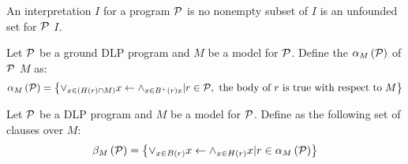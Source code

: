 \begin{defi}
An interpretation $I$ for a program $\mathcal{P}$ is  \iffTx{} no nonempty subset of $I$ is an unfounded set for $\mathcal{P}$ \wrtTx{} $I$.
\cite{conf/ijcai/KochL99}
\end{defi}

\begin{defi}
Let $\mathcal{P}$ be a ground DLP program and $M$ be a model for $\mathcal{P}$. Define the  $\alpha_M\left(\mathcal{P}\right)$ of $\mathcal{P}$ \wrtTx{} $M$ as:
\begin{equation}
\alpha_M\left(\mathcal{P}\right)=\left\{ \displaystyle\vee_{x\in\left( H\left(r\right)\cap M\right)}x\leftarrow\displaystyle\wedge_{x\in B^+\left(r\right)x}|r\in\mathcal{P},\mbox{ the body of $r$ is true with respect to{} $M$}\right\}
\end{equation}
\cite{conf/ijcai/KochL99}
\end{defi}

\begin{defi}
Let $\mathcal{P}$ be a DLP program and $M$ be a model for $\mathcal{P}$. Define  as the following set of clauses over $M$:
\begin{equation}
\beta_M\left(\mathcal{P}\right)=\left\{ \displaystyle\vee_{x\in B\left(r\right)}x\leftarrow\displaystyle\wedge_{x\in H\left(r\right)}x|r\in\alpha_M\left(\mathcal{P}\right)\right\}
\end{equation}
\cite{conf/ijcai/KochL99}
\end{defi}
